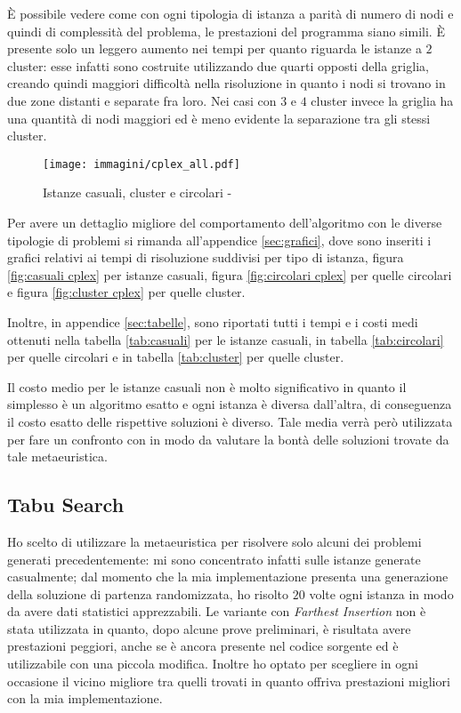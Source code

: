 È possibile vedere come con ogni tipologia di istanza a parità di numero di nodi e quindi di complessità del problema, le prestazioni del programma siano simili.
È presente solo un leggero aumento nei tempi per quanto riguarda le istanze a $2$ cluster: esse infatti sono costruite utilizzando due quarti opposti della griglia, creando quindi maggiori difficoltà nella risoluzione in quanto i nodi si trovano in due zone distanti e separate fra loro.
Nei casi con $3$ e $4$ cluster invece la griglia ha una quantità di nodi maggiori ed è meno evidente la separazione tra gli stessi cluster.

\begin{figure}[htb]
	\centering
	\texttt{[image: immagini/cplex\_all.pdf]}
	\caption{Istanze casuali, cluster e circolari - }
	\label{fig:all cplex}
\end{figure}

Per avere un dettaglio migliore del comportamento dell'algoritmo con le diverse tipologie di problemi si rimanda all'appendice \ref{sec:grafici}, dove sono inseriti i grafici relativi ai tempi di risoluzione suddivisi per tipo di istanza, figura \ref{fig:casuali cplex} per istanze casuali, figura \ref{fig:circolari cplex} per quelle circolari e figura \ref{fig:cluster cplex} per quelle cluster.

Inoltre, in appendice \ref{sec:tabelle}, sono riportati tutti i tempi e i costi medi ottenuti nella tabella \ref{tab:casuali} per le istanze casuali, in tabella \ref{tab:circolari} per quelle circolari e in tabella \ref{tab:cluster} per quelle cluster.

Il costo medio per le istanze casuali non è molto significativo in quanto il simplesso è un algoritmo esatto e ogni istanza è diversa dall'altra, di conseguenza il costo esatto delle rispettive soluzioni è diverso.
Tale media verrà però utilizzata per fare un confronto con \tabu in modo da valutare la bontà delle soluzioni trovate da tale metaeuristica.


\subsection{Tabu Search}

Ho scelto di utilizzare la metaeuristica \tabu per risolvere solo alcuni dei problemi generati precedentemente: mi sono concentrato infatti sulle istanze generate casualmente; dal momento che la mia implementazione presenta una generazione della soluzione di partenza randomizzata, ho risolto $20$ volte ogni istanza in modo da avere dati statistici apprezzabili.
Le variante con \emph{Farthest Insertion} non è stata utilizzata in quanto, dopo alcune prove preliminari, è risultata avere prestazioni peggiori, anche se è ancora presente nel codice sorgente ed è utilizzabile con una piccola modifica.
Inoltre ho optato per scegliere in ogni occasione il vicino migliore tra quelli trovati in quanto offriva prestazioni migliori con la mia implementazione.

